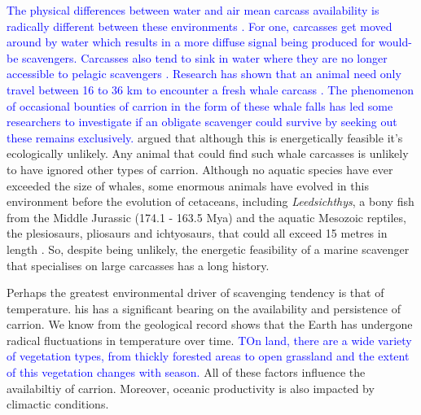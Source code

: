 \documentclass[a4paper,12pt]{article}
\begin{document}
\textcolor{blue}{The physical differences between water and air mean carcass availability is radically different between these environments \citep{beasley2012carrion}. 
For one, carcasses get moved around by water which results in a more diffuse signal being produced for would-be scavengers.
Carcasses also tend to sink in water where they are no longer accessible to pelagic scavengers \citep{beasley2012carrion}. 
Research has shown that an animal need only travel between 16 to 36 km to encounter a fresh whale carcass \citep{moleon2015living}. 
The phenomenon of occasional bounties of carrion in the form of these whale falls has led some researchers to investigate if an obligate scavenger could survive by seeking out these remains exclusively.}
\cite{ruxton2005searching} argued that although this is energetically feasible it's ecologically unlikely.
Any animal that could find such whale carcasses is unlikely to have ignored other types of carrion.
Although no aquatic species have ever exceeded the size of whales, some enormous animals have evolved in this environment before the evolution of cetaceans, including \textit{Leedsichthys}, a bony fish from the Middle Jurassic (174.1 - 163.5 Mya) and the aquatic Mesozoic reptiles, the plesiosaurs, pliosaurs and ichtyosaurs, that could all exceed 15 metres in length \citep{ruxton2011zoology,danise2014ecological}.
So, despite being unlikely, the energetic feasibility of a marine scavenger that specialises on large carcasses has a long history.

Perhaps the greatest environmental driver of scavenging tendency is that of temperature. 
his has a significant bearing on the availability and persistence of carrion.
We know from the geological record shows that the Earth has undergone radical fluctuations in temperature over time.
\textcolor{blue}{TOn land, there are a wide variety of vegetation types, from thickly forested areas to open grassland and the extent of this vegetation changes with season.}
All of these factors influence the availabiltiy of carrion.  
Moreover, oceanic productivity is also impacted by climactic conditions.
\end{document}
